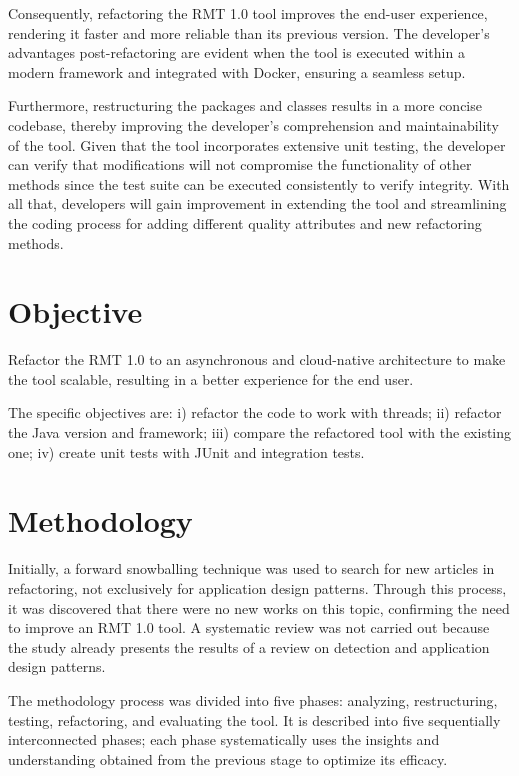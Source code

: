 Consequently, refactoring the RMT 1.0 tool improves the end-user experience, rendering it faster and more reliable than its previous version. The developer's advantages post-refactoring are evident when the tool is executed within a modern framework and integrated with Docker, ensuring a seamless setup. 

Furthermore, restructuring the packages and classes results in a more concise codebase, thereby improving the developer's comprehension and maintainability of the tool. Given that the tool incorporates extensive unit testing, the developer can verify that modifications will not compromise the functionality of other methods since the test suite can be executed consistently to verify integrity. With all that, developers will gain improvement in extending the tool and streamlining the coding process for adding different quality attributes and new refactoring methods.  


\section{Objective}
Refactor the RMT 1.0 to an asynchronous and cloud-native architecture to make the tool scalable, resulting in a better experience for the end user.

The specific objectives are: i) refactor the code to work with threads; ii) refactor the Java version and framework; iii) compare the refactored tool with the existing one; iv) create unit tests with JUnit and integration tests.

\section{Methodology}
Initially, a forward snowballing technique was used to search for new articles in refactoring, not exclusively for application design patterns. Through this process, it was discovered that there were no new works on this topic, confirming the need to improve an RMT 1.0 tool. A systematic review was not carried out because the study \cite{beluzzo2018abordagem} already presents the results of a review on detection and application design patterns.

The methodology process was divided into five phases: analyzing, restructuring, testing, refactoring, and evaluating the tool. It is described into five sequentially interconnected phases; each phase systematically uses the insights and understanding obtained from the previous stage to optimize its efficacy.
 

